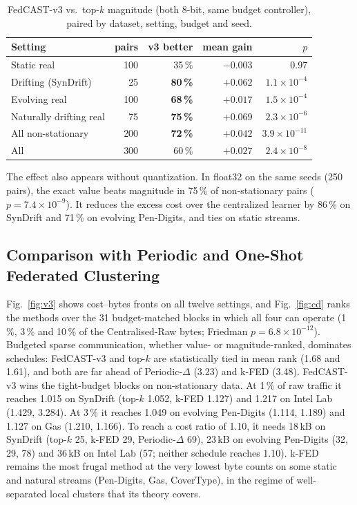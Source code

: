 \documentclass[journal]{IEEEtran}
\begin{document}
\begin{table}[t]
\centering
\caption{FedCAST-v3 vs.\ top-$k$ magnitude (both 8-bit, same budget controller), paired by dataset, setting, budget and seed.}\label{tab:paired}
\setlength{\tabcolsep}{4pt}
\begin{tabular}{@{}lrrrr@{}}
\toprule
Setting & pairs & v3 better & mean gain & $p$\\
\midrule
Static real & 100 & 35\,\% & $-0.003$ & 0.97\\
Drifting (SynDrift) & 25 & \textbf{80\,\%} & $+0.062$ & $1.1\times10^{-4}$\\
Evolving real & 100 & \textbf{68\,\%} & $+0.017$ & $1.5\times10^{-4}$\\
Naturally drifting real & 75 & \textbf{75\,\%} & $+0.069$ & $2.3\times10^{-6}$\\
\midrule
All non-stationary & 200 & \textbf{72\,\%} & $+0.042$ & $3.9\times10^{-11}$\\
All & 300 & 60\,\% & $+0.027$ & $2.4\times10^{-8}$\\
\bottomrule
\end{tabular}
\end{table}

The effect also appears without quantization. In float32 on the same seeds (250 pairs), the exact value beats magnitude in 75\,\% of non-stationary pairs ($p=7.4\times10^{-9}$). It reduces the excess cost over the centralized learner by 86\,\% on SynDrift and 71\,\% on evolving Pen-Digits, and ties on static streams.

\subsection{Comparison with Periodic and One-Shot Federated Clustering}
Fig.~\ref{fig:v3} shows cost--bytes fronts on all twelve settings, and Fig.~\ref{fig:cd} ranks the methods over the 31 budget-matched blocks in which all four can operate (1\,\%, 3\,\% and 10\,\% of the Centralised-Raw bytes; Friedman $p=6.8\times10^{-12}$). Budgeted sparse communication, whether value- or magnitude-ranked, dominates schedules: FedCAST-v3 and top-$k$ are statistically tied in mean rank (1.68 and 1.61), and both are far ahead of Periodic-$\Delta$ (3.23) and k-FED (3.48). FedCAST-v3 wins the tight-budget blocks on non-stationary data. At 1\,\% of raw traffic it reaches 1.015 on SynDrift (top-$k$ 1.052, k-FED 1.127) and 1.217 on Intel Lab (1.429, 3.284). At 3\,\% it reaches 1.049 on evolving Pen-Digits (1.114, 1.189) and 1.127 on Gas (1.210, 1.166). To reach a cost ratio of 1.10, it needs 18\,kB on SynDrift (top-$k$ 25, k-FED 29, Periodic-$\Delta$ 69), 23\,kB on evolving Pen-Digits (32, 29, 78) and 36\,kB on Intel Lab (57; neither schedule reaches 1.10). k-FED remains the most frugal method at the very lowest byte counts on some static and natural streams (Pen-Digits, Gas, CoverType), in the regime of well-separated local clusters that its theory covers.
\end{document}
